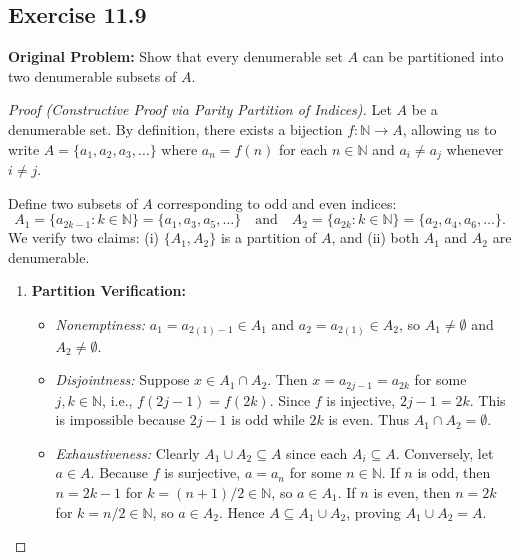 \documentclass[11pt, letterpaper]{article}
\theoremstyle{definition}
\theoremstyle{remark}
\begin{document}
\subsection*{Exercise 11.9}
\textbf{Original Problem:} Show that every denumerable set $A$ can be partitioned into two denumerable subsets of $A$.

\begin{proof}[Proof (Constructive Proof via Parity Partition of Indices)]
Let $A$ be a denumerable set. By definition, there exists a bijection $f : \mathbb{N} \to A$, allowing us to write $A = \{a_1, a_2, a_3, \dots\}$ where $a_n = f(n)$ for each $n \in \mathbb{N}$ and $a_i \neq a_j$ whenever $i \neq j$.

Define two subsets of $A$ corresponding to odd and even indices:
\[
A_1 = \{a_{2k - 1} : k \in \mathbb{N}\} = \{a_1, a_3, a_5, \dots\} \quad \text{and} \quad A_2 = \{a_{2k} : k \in \mathbb{N}\} = \{a_2, a_4, a_6, \dots\}.
\]
We verify two claims: (i) $\{A_1, A_2\}$ is a partition of $A$, and (ii) both $A_1$ and $A_2$ are denumerable.

\begin{enumerate}[label=(\arabic*)]
    \item \textbf{Partition Verification:}
    \begin{itemize}
        \item \textit{Nonemptiness:} $a_1 = a_{2(1)-1} \in A_1$ and $a_2 = a_{2(1)} \in A_2$, so $A_1 \neq \emptyset$ and $A_2 \neq \emptyset$.
        \item \textit{Disjointness:} Suppose $x \in A_1 \cap A_2$. Then $x = a_{2j - 1} = a_{2k}$ for some $j, k \in \mathbb{N}$, i.e., $f(2j - 1) = f(2k)$. Since $f$ is injective, $2j - 1 = 2k$. This is impossible because $2j - 1$ is odd while $2k$ is even. Thus $A_1 \cap A_2 = \emptyset$.
        \item \textit{Exhaustiveness:} Clearly $A_1 \cup A_2 \subseteq A$ since each $A_i \subseteq A$. Conversely, let $a \in A$. Because $f$ is surjective, $a = a_n$ for some $n \in \mathbb{N}$. If $n$ is odd, then $n = 2k - 1$ for $k = (n+1)/2 \in \mathbb{N}$, so $a \in A_1$. If $n$ is even, then $n = 2k$ for $k = n/2 \in \mathbb{N}$, so $a \in A_2$. Hence $A \subseteq A_1 \cup A_2$, proving $A_1 \cup A_2 = A$.
    \end{itemize}
    

\end{enumerate}
\end{proof}
\end{document}
